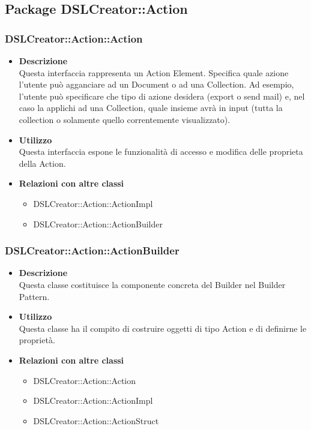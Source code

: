\subsection{Package DSLCreator::Action}
 \subsubsection{DSLCreator::Action::Action}
                    \begin{itemize}
                        \item \textbf{Descrizione} \hfill \\
                          Questa interfaccia rappresenta un Action Element. Specifica quale azione l'utente può agganciare ad un Document o ad una Collection. Ad esempio, l'utente può specificare che tipo di azione desidera (export o send mail) e, nel caso la applichi ad una Collection, quale insieme avrà in input (tutta la collection o solamente quello correntemente visualizzato).
                        \item \textbf{Utilizzo} \hfill \\
                          Questa interfaccia espone le funzionalità di accesso e modifica delle proprieta della Action.
                        \item \textbf{Relazioni con altre classi}
                            \begin{itemize}
                              \item DSLCreator::Action::ActionImpl
                              \item DSLCreator::Action::ActionBuilder
                            \end{itemize}
                    \end{itemize}  

 \subsubsection{DSLCreator::Action::ActionBuilder}
                    \begin{itemize}
                        \item \textbf{Descrizione} \hfill \\
                          Questa classe costituisce la componente concreta del Builder nel Builder Pattern.
                        \item \textbf{Utilizzo} \hfill \\
                          Questa classe ha il compito di costruire oggetti di tipo Action e di definirne le proprietà.
                        \item \textbf{Relazioni con altre classi}
                            \begin{itemize}
                              \item DSLCreator::Action::Action
                              \item DSLCreator::Action::ActionImpl
                              \item DSLCreator::Action::ActionStruct
                            \end{itemize}
                    \end{itemize}  


